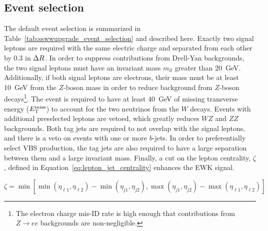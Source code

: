 \subsection{Event selection}\label{sswwupgrade:event_selection}
The default event selection is summarized in Table~\ref{tab:sswwupgrade_event_selection} and described here.
Exactly two signal leptons are required with the same electric charge and separated from each other by 0.3 in $\Delta R$.
In order to suppress contributions from Drell-Yan backgrounds, the two signal leptons must have an invariant mass $m_{ll}$ greater than 20~GeV.
Additionally, if both signal leptons are electrons, their mass must be at least 10~GeV from the $Z$-boson mass in order to reduce background from $Z$-boson decays\footnote{The electron charge mis-ID rate is high enough that contributions from $Z\rightarrow ee$ backgrounds are non-negligible.}.
The event is required to have at least 40~GeV of missing transverse energy ($E_{\mathrm{T}}^{\mathrm{miss}}$) to account for the two neutrinos from the $W$ decays.
Events with additional preselected leptons are vetoed, which greatly reduces $WZ$ and $ZZ$ backgrounds.
Both tag jets are required to not overlap with the signal leptons, and there is a veto on events with one or more $b$-jets.
In order to preferentially select VBS production, the tag jets are also required to have a large separation between them and a large invariant mass.
Finally, a cut on the lepton centrality, $\zeta$, defined in Equation~\ref{eq:lepton_jet_centrality} enhances the EWK \ssww signal.

\begin{equation}
\zeta = \min [\min (\eta_{\ell1}, \eta_{\ell2} )-\min(\eta_{j1},\eta_{j2}), \max(\eta_{j1},\eta_{j2})-\max(\eta_{\ell1},\eta_{\ell2}) ]
\label{eq:lepton_jet_centrality}
\end{equation}

